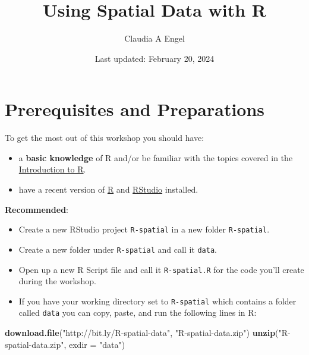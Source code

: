 \documentclass[
]{book}
\title{Using Spatial Data with R}
\author{Claudia A Engel}
\date{Last updated: February 20, 2024}
\newenvironment{Shaded}{\begin{snugshade}}{\end{snugshade}}
\newcommand{\AttributeTok}[1]{\textcolor[rgb]{0.13,0.29,0.53}{#1}}
\newcommand{\FunctionTok}[1]{\textcolor[rgb]{0.13,0.29,0.53}{\textbf{#1}}}
\newcommand{\NormalTok}[1]{#1}
\newcommand{\StringTok}[1]{\textcolor[rgb]{0.31,0.60,0.02}{#1}}
\providecommand{\tightlist}{%
  \setlength{\itemsep}{0pt}\setlength{\parskip}{0pt}}
\begin{document}
\maketitle

{
\setcounter{tocdepth}{1}
\tableofcontents
}
\hypertarget{prerequisites-and-preparations}{%
\chapter*{Prerequisites and Preparations}\label{prerequisites-and-preparations}}

To get the most out of this workshop you should have:

\begin{itemize}
\tightlist
\item
  a \textbf{basic knowledge} of R and/or be familiar with the topics covered in the \href{https://cengel.github.io/R-intro/}{Introduction to R}.
\item
  have a recent version of \href{https://cran.r-project.org/}{R} and \href{https://www.rstudio.com/}{RStudio} installed.
\end{itemize}

\textbf{Recommended}:

\begin{itemize}
\item
  Create a new RStudio project \texttt{R-spatial} in a new folder \texttt{R-spatial}.
\item
  Create a new folder under \texttt{R-spatial} and call it \texttt{data}.
\item
  Open up a new R Script file and call it \texttt{R-spatial.R} for the code you'll create during the workshop.
\item
  If you have your working directory set to \texttt{R-spatial} which contains a folder called \texttt{data} you can copy, paste, and run the following lines in R:
\end{itemize}

\begin{Shaded}
\begin{Highlighting}[]
\FunctionTok{download.file}\NormalTok{(}\StringTok{"http://bit.ly/R{-}spatial{-}data"}\NormalTok{, }\StringTok{"R{-}spatial{-}data.zip"}\NormalTok{)}
\FunctionTok{unzip}\NormalTok{(}\StringTok{"R{-}spatial{-}data.zip"}\NormalTok{, }\AttributeTok{exdir =} \StringTok{"data"}\NormalTok{)}
\end{Highlighting}
\end{Shaded}
\end{document}
